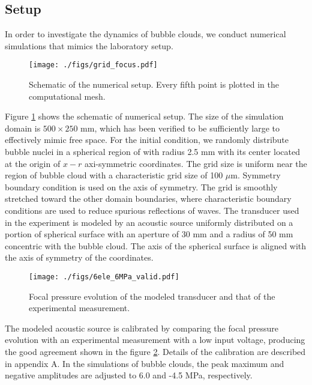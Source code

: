 \documentclass{jfm}
\begin{document}
\subsection{Setup}
In order to investigate the dynamics of bubble clouds, we conduct numerical simulations that mimics the laboratory setup.
\begin{figure}
  \center
  \texttt{[image: ./figs/grid\_focus.pdf]}
  \caption{Schematic of the numerical setup. Every fifth point is plotted in the computational mesh.}
   \label{fig:focus_setup} 
\end{figure}
Figure \ref{fig:focus_setup} shows the schematic of numerical setup.
The size of the simulation domain is $500\times250$ mm, which has been verified to be sufficiently large to effectively mimic free space.
For the initial condition, we randomly distribute bubble nuclei in a spherical region of with radius 2.5 mm with its center located at the origin of $x-r$ axi-symmetric coordinates.
The grid size is uniform near the region of bubble cloud with a characteristic grid size of 100 $\mu$m. Symmetry boundary condition is used on the axis of symmetry.
The grid is smoothly stretched toward the other domain boundaries, where characteristic boundary conditions are used to reduce spurious reflections of waves.
The transducer used in the experiment is modeled by an acoustic source uniformly distributed on a portion of spherical surface with an aperture of 30 mm and a radius of 50 mm concentric with the bubble cloud.
The axis of the spherical surface is aligned with the axis of symmetry of the coordinates.

\begin{figure}
  \center
  \texttt{[image: ./figs/6ele\_6MPa\_valid.pdf]}
  \caption{Focal pressure evolution of the modeled transducer and that of the experimental measurement.}
   \label{fig:waveform} 
\end{figure}
The modeled acoustic source is calibrated by comparing the focal pressure evolution with an experimental measurement with a low input voltage, producing the good agreement shown in the figure \ref{fig:waveform}.
Details of the calibration are described in appendix A.
In the simulations of bubble clouds, the peak maximum and negative amplitudes are adjusted to 6.0 and -4.5 MPa, respectively.
\end{document}
